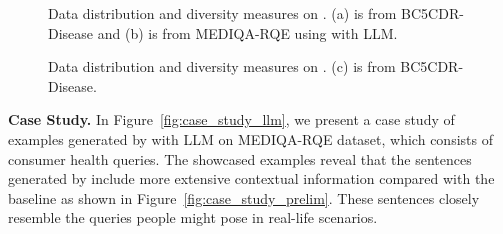\begin{figure}
	\centering
	\vspace{-2ex}
         \hspace{-2ex}
	\caption{Data distribution and diversity measures on {\ours}. (a) is from BC5CDR-Disease and (b) is from MEDIQA-RQE using {\ours} with LLM. \vspace{-1.5ex}}
	\vspace{-1ex}
\label{fig:quality_ana1}
\end{figure}

 \begin{figure}
	\centering
	\vspace{-2ex}
         \hspace{-1.5ex}
 \hspace{-1.5ex}
	\caption{Data distribution and diversity measures on {\ours}. (c) is from BC5CDR-Disease.\vspace{-2ex}}
	\vspace{-1ex}
\label{fig:quality_ana2}
\end{figure}



\textbf{Case Study.}
In Figure~\ref{fig:case_study_llm}, we present a case study of examples generated by {\ours} with LLM on MEDIQA-RQE dataset, which consists of consumer health queries. The showcased examples reveal that the sentences generated by {\ours} include more extensive contextual information compared with the baseline as shown in Figure~\ref{fig:case_study_prelim}. These sentences closely resemble the queries people might pose in real-life scenarios.
